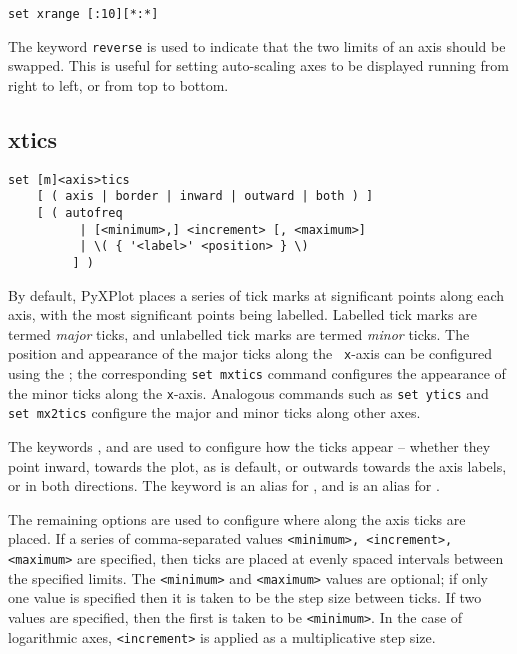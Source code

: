 \begin{verbatim}
set xrange [:10][*:*]
\end{verbatim}

The keyword {\tt reverse} is used to indicate that the two limits of an axis
should be swapped. This is useful for setting auto-scaling axes to be displayed
running from right to left, or from top to bottom.


\subsection{xtics}

\begin{verbatim}
set [m]<axis>tics
    [ ( axis | border | inward | outward | both ) ]
    [ ( autofreq
          | [<minimum>,] <increment> [, <maximum>]
          | \( { '<label>' <position> } \)
         ] )
\end{verbatim}

By default, PyXPlot places a series of tick marks at significant points along
each axis, with the most significant points being labelled.  Labelled tick
marks are termed {\it major} ticks, and unlabelled tick marks are termed {\it
minor} ticks.  The position and appearance of the major ticks along the {\tt
x}-axis can be configured using the ; the corresponding
{\tt set mxtics} command configures the appearance of the minor ticks along the
{\tt x}-axis. Analogous commands such as {\tt set ytics} and {\tt set mx2tics}
configure the major and minor ticks along other axes.

The keywords ,  and  are used to
configure how the ticks appear -- whether they point inward, towards the plot,
as is default, or outwards towards the axis labels, or in both directions.  The
keyword  is an alias for , and 
is an alias for .

The remaining options are used to configure where along the axis ticks are
placed. If a series of comma-separated values {\tt <minimum>, <increment>,
<maximum>} are specified, then ticks are placed at evenly spaced intervals
between the specified limits. The {\tt <minimum>} and {\tt <maximum>} values
are optional; if only one value is specified then it is taken to be the step
size between ticks. If two values are specified, then the first is taken to be
{\tt <minimum>}. In the case of logarithmic axes, {\tt <increment>} is applied
as a multiplicative step size.

